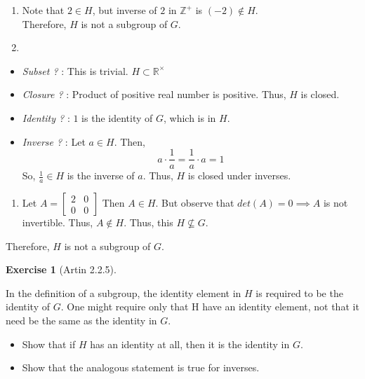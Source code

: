 \documentclass[
]{book}
\providecommand{\tightlist}{%
  \setlength{\itemsep}{0pt}\setlength{\parskip}{0pt}}
\theoremstyle{definition}
\theoremstyle{definition}
\theoremstyle{definition}
\newtheorem{exercise}{Exercise}[chapter]
\theoremstyle{definition}
\theoremstyle{remark}
\begin{document}
\begin{enumerate}
\def\labelenumi{(\alph{enumi})}
\setcounter{enumi}{2}
\item
  Note that \(2\in H\), but inverse of \(2\) in \(\mathbb{Z}^+\) is \((-2) \not \in H\).\\
  Therefore, \(H\) is not a subgroup of \(G\).
\item
\end{enumerate}

\begin{itemize}
\item
  \emph{Subset ?} : This is trivial. \(H \subset \mathbb{R}^\times\)
\item
  \emph{Closure ?} : Product of positive real number is positive. Thus, \(H\) is closed.
\item
  \emph{Identity ?} : \(1\) is the identity of \(G\), which is in \(H\).
\item
  \emph{Inverse ?} : Let \(a\in H\). Then,
  \[a\cdot \frac{1}{a}=\frac{1}{a}\cdot a=1\]
  So, \(\frac{1}{a}\in H\) is the inverse of \(a\). Thus, \(H\) is closed under inverses.
\end{itemize}

\begin{enumerate}
\def\labelenumi{(\alph{enumi})}
\setcounter{enumi}{4}
\tightlist
\item
  Let \(A=\begin{bmatrix} 2 & 0 \\ 0 & 0 \end{bmatrix}\) Then \(A\in H\). But observe that \(det(A)=0\implies A\) is not invertible. Thus, \(A\not\in H\). Thus, this \(H \not\subseteq G\).
\end{enumerate}

Therefore, \(H\) is not a subgroup of \(G\).

\begin{exercise}[Artin 2.2.5]
\protect\hypertarget{exr:unnamed-chunk-88}{}\label{exr:unnamed-chunk-88}

In the definition of a subgroup, the identity element in \(H\) is required to be the identity
of \(G\). One might require only that H have an identity element, not that it need be the
same as the identity in \(G\).

\begin{itemize}
\tightlist
\item
  Show that if \(H\) has an identity at all, then it is the identity in \(G\).
\item
  Show that the analogous statement is true for inverses.
\end{itemize}

\end{exercise}
\end{document}
